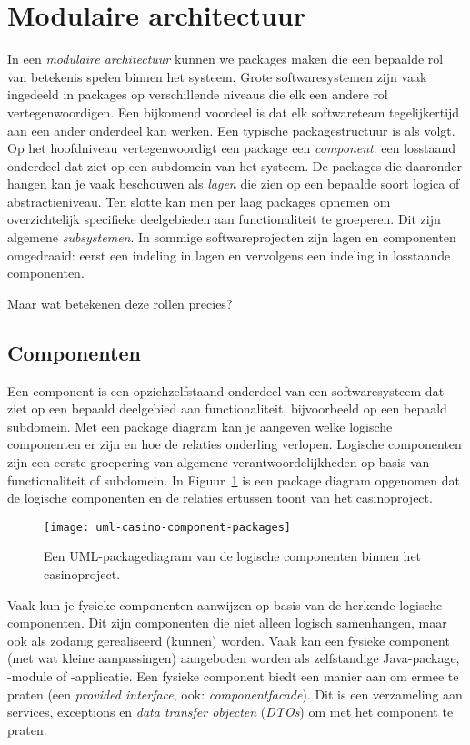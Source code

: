 \section{Modulaire architectuur}
In een \emph{modulaire architectuur} kunnen we packages maken 
die een bepaalde rol van betekenis spelen binnen het systeem. 
Grote softwaresystemen zijn vaak ingedeeld in packages op 
verschillende niveaus die elk een andere rol vertegenwoordigen.
Een bijkomend voordeel is dat elk softwareteam tegelijkertijd 
aan een ander onderdeel kan werken.
Een typische packagestructuur is als volgt. Op het hoofdniveau vertegenwoordigt
een package een \emph{component}: een losstaand onderdeel dat ziet op een subdomein van het systeem.
De packages die daaronder hangen kan je vaak beschouwen als \emph{lagen} die zien op een
bepaalde soort logica of abstractieniveau. Ten slotte kan men per laag packages opnemen 
om overzichtelijk specifieke deelgebieden aan functionaliteit te groeperen.
Dit zijn algemene \emph{subsystemen}.
In sommige softwareprojecten zijn lagen en componenten omgedraaid: 
eerst een indeling in lagen en vervolgens een indeling in losstaande componenten.

Maar wat betekenen deze rollen precies?

\subsection{Componenten}
Een component is een opzichzelfstaand onderdeel van een softwaresysteem
dat ziet op een bepaald deelgebied aan functionaliteit, bijvoorbeeld op een 
bepaald subdomein. Met een package diagram kan je aangeven welke 
logische componenten er zijn en hoe de relaties onderling verlopen.
Logische componenten zijn een eerste groepering van 
algemene verantwoordelijkheden op basis van functionaliteit of subdomein. 
In Figuur~\ref{fig:uml-casino-component-packages} is een package diagram opgenomen
dat de logische componenten en de relaties ertussen toont van het casinoproject.

\begin{figure}[H]
    \centering
    \texttt{[image: uml-casino-component-packages]}
    \caption{Een UML-packagediagram van de logische componenten binnen het casinoproject.}
    \label{fig:uml-casino-component-packages}
\end{figure}

Vaak kun je fysieke componenten aanwijzen op basis van de herkende logische componenten.
Dit zijn componenten die niet alleen logisch samenhangen, maar ook als zodanig 
gerealiseerd (kunnen) worden. Vaak kan een fysieke component (met wat kleine aanpassingen)
aangeboden worden als zelfstandige Java-package, -module of -applicatie.
Een fysieke component biedt een manier aan om ermee te praten 
(een \emph{provided interface}, ook: \emph{componentfacade}).
Dit is een verzameling aan services, exceptions en \emph{data transfer objecten} (\emph{DTOs}) 
om met het component te praten.

